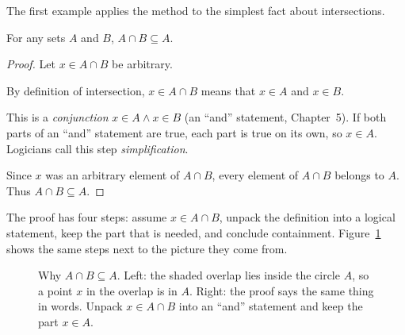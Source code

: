The first example applies the method to the simplest fact about intersections.

\begin{theorem}
For any sets $A$ and $B$, $A \cap B \subseteq A$.
\end{theorem}

\begin{proof}
Let $x \in A \cap B$ be arbitrary. 

By definition of intersection, $x \in A \cap B$ means that $x \in A$ and $x \in B$. 

This is a \emph{conjunction} $x \in A \land x \in B$ (an ``and'' statement, Chapter~5). If both parts of an ``and'' statement are true, each part is true on its own, so $x \in A$. Logicians call this step \emph{simplification}.

Since $x$ was an arbitrary element of $A \cap B$, every element of $A \cap B$ belongs to $A$. Thus $A \cap B \subseteq A$.
\end{proof}

The proof has four steps: assume $x \in A \cap B$, unpack the definition into a logical statement, keep the part that is needed, and conclude containment. Figure~\ref{11:fig-warmup-intersection} shows the same steps next to the picture they come from.

\begin{figure}[htbp]
\centering
{}
\caption{Why $A \cap B \subseteq A$. Left: the shaded overlap lies inside the circle $A$, so a point $x$ in the overlap is in $A$. Right: the proof says the same thing in words. Unpack $x \in A \cap B$ into an ``and'' statement and keep the part $x \in A$.}
\label{11:fig-warmup-intersection}
\end{figure}


